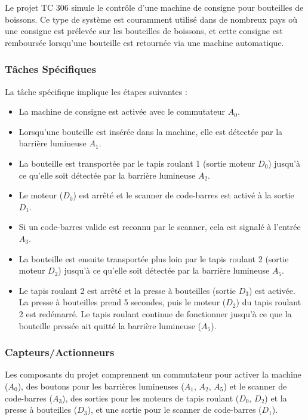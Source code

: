 \documentclass[a4paper,12pt]{report}
\begin{document}
Le projet TC 306 simule le contrôle d'une machine de consigne pour bouteilles de boissons. Ce type de système est couramment utilisé dans de nombreux pays où une consigne est prélevée sur les bouteilles de boissons, et cette consigne est remboursée lorsqu'une bouteille est retournée via une machine automatique.

\subsubsection{Tâches Spécifiques}

La tâche spécifique implique les étapes suivantes :
\begin{itemize}
    \item La machine de consigne est activée avec le commutateur \(A_0\).
    \item Lorsqu'une bouteille est insérée dans la machine, elle est détectée par la barrière lumineuse \(A_1\).
    \item La bouteille est transportée par le tapis roulant 1 (sortie moteur \(D_0\)) jusqu'à ce qu'elle soit détectée par la barrière lumineuse \(A_2\).
    \item Le moteur (\(D_0\)) est arrêté et le scanner de code-barres est activé à la sortie \(D_1\).
    \item Si un code-barres valide est reconnu par le scanner, cela est signalé à l'entrée \(A_3\).
    \item La bouteille est ensuite transportée plus loin par le tapis roulant 2 (sortie moteur \(D_2\)) jusqu'à ce qu'elle soit détectée par la barrière lumineuse \(A_5\).
    \item Le tapis roulant 2 est arrêté et la presse à bouteilles (sortie \(D_3\)) est activée. La presse à bouteilles prend 5 secondes, puis le moteur (\(D_2\)) du tapis roulant 2 est redémarré. Le tapis roulant continue de fonctionner jusqu'à ce que la bouteille pressée ait quitté la barrière lumineuse (\(A_5\)).
\end{itemize}

\subsubsection{Capteurs/Actionneurs}

Les composants du projet comprennent un commutateur pour activer la machine (\(A_0\)), des boutons pour les barrières lumineuses (\(A_1\), \(A_2\), \(A_5\)) et le scanner de code-barres (\(A_3\)), des sorties pour les moteurs de tapis roulant (\(D_0\), \(D_2\)) et la presse à bouteilles (\(D_3\)), et une sortie pour le scanner de code-barres (\(D_1\)).
\end{document}
